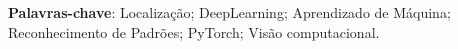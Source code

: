 
\begin{resumo}
  

\vspace{\onelineskip}

\noindent 

\textbf{Palavras-chave}: Localização; DeepLearning; Aprendizado de Máquina; Reconhecimento de Padrões; PyTorch; Visão computacional.
\end{resumo}